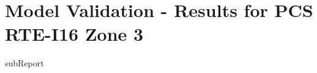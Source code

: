 




    \section{Model Validation - Results for PCS RTE-I16 Zone 3}

    {{subReport}}
    \newpage

